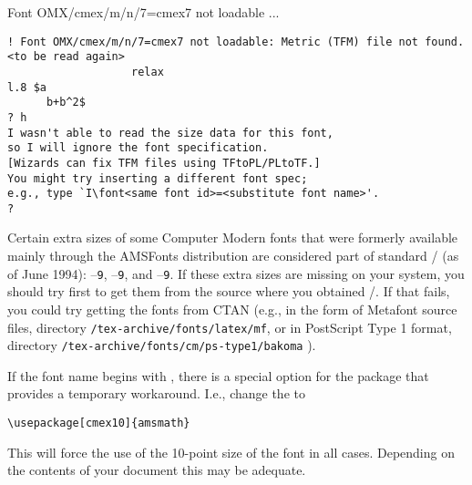 \documentclass[leqno,titlepage,openany]{amsldoc}
\newcommand{\nfn}[1]{\texttt{#1}}
\begin{document}

\begin{error}{Font OMX/cmex/m/n/7=cmex7 not loadable ...}
\errexa
\begin{verbatim}
! Font OMX/cmex/m/n/7=cmex7 not loadable: Metric (TFM) file not found.
<to be read again>
                   relax
l.8 $a
      b+b^2$
? h
I wasn't able to read the size data for this font,
so I will ignore the font specification.
[Wizards can fix TFM files using TFtoPL/PLtoTF.]
You might try inserting a different font spec;
e.g., type `I\font<same font id>=<substitute font name>'.
?
\end{verbatim}
\errexpl
Certain extra sizes of some Computer Modern fonts that were formerly
available mainly through the AMSFonts
distribution are considered part of standard \latex/ (as of June 1994):
--\texttt{9}, --\texttt{9}, and
--\texttt{9}. If these extra sizes are missing on your
system, you should try first to get them from the source where you
obtained \latex/. If that fails, you could try getting the fonts from
CTAN (e.g., in the form of Metafont source
files, directory \nfn{/tex-archive/fonts/latex/mf}, or in PostScript
Type 1 format, directory
\nfn{/tex-archive/fonts/cm/ps-type1/bakoma}\relax
{}).

If the font name begins with , there is a special option
 for the  package that provides a temporary
workaround. I.e., change the  to
\begin{verbatim}
\usepackage[cmex10]{amsmath}
\end{verbatim}
This will force the use of the 10-point size of the  font in
all cases. Depending on the contents of your document this may be
adequate.
\end{error}
\end{document}

